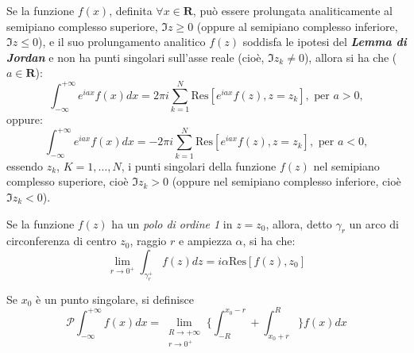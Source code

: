 \begin{theorem}
    Se la funzione $f(x)$, definita $\forall x\in\mathbf{R}$, può essere prolungata analiticamente al semipiano complesso superiore, $\Im z\ge0$ (oppure al semipiano complesso inferiore, $\Im z\le0$), e il suo prolungamento analitico $f(z)$ soddisfa le ipotesi del \textbf{\textit{Lemma di Jordan}} e non ha punti singolari sull'asse reale (cioè, $\Im z_k\neq0$), allora si ha che ($a\in \mathbf{R}$):
    \[
        \int_{-\infty}^{+\infty}e^{iax}f(x)dx = 2\pi i \sum_{k=1}^{N} \text{Res}[e^{iax}f(z), z=z_k],\text{ per }a>0,
    \]
    oppure:
    \[
        \int_{-\infty}^{+\infty}e^{iax}f(x)dx =- 2\pi i \sum_{k=1}^{N} \text{Res}[e^{iax}f(z), z=z_k],\text{ per }a<0,
    \]
    essendo $z_k$, $K=1,\dots,N$, i punti singolari della funzione $f(z)$ nel semipiano complesso superiore, cioè $\Im z_k >0$ (oppure nel semipiano complesso inferiore, cioè $\Im z_k<0$).
\end{theorem}
\begin{theorem}
    Se la funzione $f(z)$ ha un \textit{polo di ordine 1} in $z=z_0$, allora, detto $\gamma_r$ un arco di circonferenza di centro $z_0$, raggio $r$ e ampiezza $\alpha$, si ha che:
    \[
        \lim_{r\to0^+}\int_{\gamma^+_r}f(z) dz = i\alpha \text{Res}[f(z), z_0]
    \]
\end{theorem}
\begin{definition}
    Se $x_0$ è un punto singolare, si definisce
    \[
        \mathcal{P}\int_{-\infty}^{+\infty}f(x)dx = \lim_{\substack{R\to+\infty \\ r\to0^+}} \Big\{\int_{-R}^{x_0-r}+\int_{x_0+r}^{R}\Big\}f(x)dx
    \]    
\end{definition}
 
